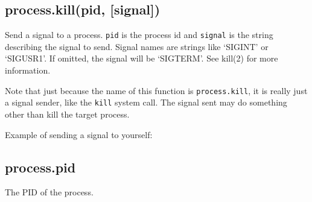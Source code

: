 \subsection{process.kill(pid, {[}signal{]})}

Send a signal to a process. \texttt{pid} is the process id and
\texttt{signal} is the string describing the signal to send. Signal
names are strings like `SIGINT' or `SIGUSR1'. If omitted, the signal
will be `SIGTERM'. See kill(2) for more information.

Note that just because the name of this function is
\texttt{process.kill}, it is really just a signal sender, like the
\texttt{kill} system call. The signal sent may do something other than
kill the target process.

Example of sending a signal to yourself:

\begin{Shaded}
\begin{Highlighting}[]
\NormalTok{(}\NormalTok{, } \NormalTok{() \{}
  \NormalTok{(}\NormalTok{);}
\NormalTok{\});}

 \NormalTok{() \{}
  \NormalTok{(}\NormalTok{);}
  \NormalTok{(}\NormalTok{);}
\NormalTok{\}, }\NormalTok{);}

\NormalTok{(}\NormalTok{, }\NormalTok{);}
\end{Highlighting}
\end{Shaded}

\subsection{process.pid}

The PID of the process.

\begin{Shaded}
\begin{Highlighting}[]
\NormalTok{(} \NormalTok{+ }\NormalTok{);}
\end{Highlighting}
\end{Shaded}

